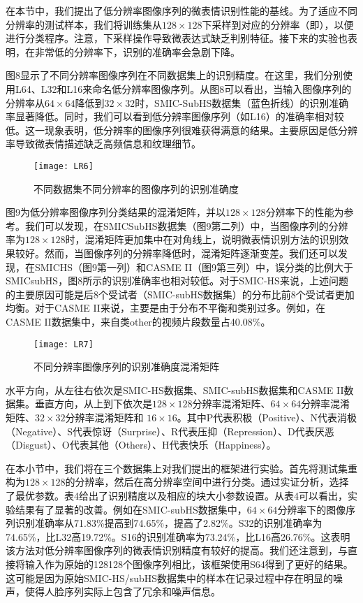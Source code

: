 在本节中，我们提出了低分辨率图像序列的微表情识别性能的基线。为了适应不同分辨率的测试样本，我们将训练集从$ 128 \times 128 $下采样到对应的分辨率（即），以便进行分类程序。注意，下采样操作导致微表达式缺乏判别特征。接下来的实验也表明，在非常低的分辨率下，识别的准确率会急剧下降。

图8显示了不同分辨率图像序列在不同数据集上的识别精度。在这里，我们分别使用L64、L32和L16来命名低分辨率图像序列。从图8可以看出，当输入图像序列的分辨率从$ 64 \times 64 $降低到$ 32 \times 32 $时，SMIC-SubHS数据集（蓝色折线）的识别准确率显著降低。同时，我们可以看到低分辨率图像序列（如L16）的准确率相对较低。这一现象表明，低分辨率的图像序列很难获得满意的结果。主要原因是低分辨率导致微表情描述缺乏高频信息和纹理细节。

\begin{figure}[!htbp]
  \centering
  \texttt{[image: LR6]}
  \caption{不同数据集不同分辨率的图像序列的识别准确度}
  \label{fig19}
\end{figure}

图9为低分辨率图像序列分类结果的混淆矩阵，并以$ 128 \times 128 $分辨率下的性能为参考。我们可以发现，在SMICSubHS数据集（图9第二列）中，当图像序列的分辨率为$ 128 \times 128 $时，混淆矩阵更加集中在对角线上，说明微表情识别方法的识别效果较好。然而，当图像序列的分辨率降低时，混淆矩阵逐渐变差。我们还可以发现，在SMICHS（图9第一列）和CASME II（图9第三列）中，误分类的比例大于SMICsubHS，图8所示的识别准确率也相对较低。对于SMIC-HS来说，上述问题的主要原因可能是后8个受试者（SMIC-subHS数据集）的分布比前8个受试者更加均衡。对于CASME II来说，主要是由于分布不平衡和类别过多。例如，在CASME II数据集中，来自类other的视频片段数量占40.08\%。

\begin{figure}[!htbp]
  \centering
  \texttt{[image: LR7]}
  \caption{不同分辨率图像序列的识别准确度混淆矩阵}
  \label{fig20}
\end{figure}

水平方向，从左往右依次是SMIC-HS数据集、SMIC-subHS数据集和CASME II数据集。垂直方向，从上到下依次是$ 128 \times 128 $分辨率混淆矩阵、$ 64 \times 64 $分辨率混淆矩阵、$ 32 \times 32 $分辨率混淆矩阵和 $ 16 \times 16 $。其中P代表积极（Positive）、N代表消极（Negative）、S代表惊讶（Surprise）、R代表压抑（Repression）、D代表厌恶（Disgust）、O代表其他（Others）、H代表快乐（Happiness）。

在本小节中，我们将在三个数据集上对我们提出的框架进行实验。首先将测试集重构为$ 128 \times 128 $的分辨率，然后在高分辨率空间中进行分类。通过实证分析，选择了最优参数。表4给出了识别精度以及相应的块大小参数设置。从表4可以看出，实验结果有了显著的改善。例如在SMIC-subHS数据集中，$ 64 \times 64 $分辨率下的图像序列识别准确率从71.83\%提高到74.65\%，提高了2.82\%。S32的识别准确率为74.65\%，比L32高19.72\%。S16的识别准确率为73.24\%，比L16高26.76\%。这表明该方法对低分辨率图像序列的微表情识别精度有较好的提高。我们还注意到，与直接将输入作为原始的128128个图像序列相比，该框架使用S64得到了更好的结果。这可能是因为原始SMIC-HS/subHS数据集中的样本在记录过程中存在明显的噪声，使得人脸序列实际上包含了冗余和噪声信息。


